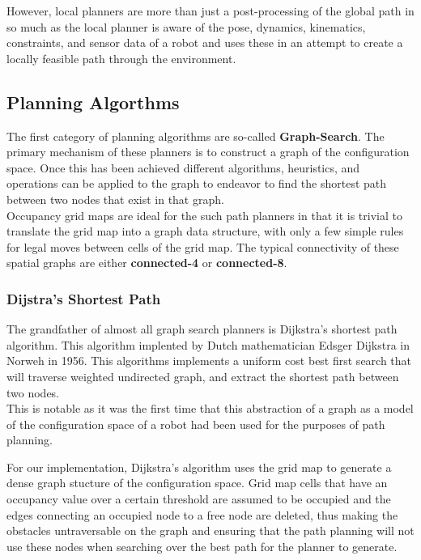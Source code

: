 \documentclass[journal]{IEEEtran}
\begin{document}
However, local planners are more than just a post-processing of the global path in so much as the local planner is aware of the pose, dynamics, kinematics, constraints, and sensor data of a robot and uses these in an attempt to create a locally feasible path through the environment. 


\subsection{Planning Algorthms}

The first category of planning algorithms are so-called \textbf{Graph-Search}. The primary mechanism of these planners is to construct a graph of the configuration space. Once this has been achieved different algorithms, heuristics, and operations can be applied to the graph to endeavor to find the shortest path between two nodes that exist in that graph. \\

Occupancy grid maps are ideal for the such path planners in that it is trivial to translate the grid map into a graph data structure, with only a few simple rules for legal moves between cells of the grid map. The typical connectivity of these spatial graphs are either \textbf{connected-4} or \textbf{connected-8}.


\subsubsection{Dijstra's Shortest Path}
The grandfather of almost all graph search planners is Dijkstra's shortest path algorithm. This algorithm implented by Dutch mathematician Edsger Dijkstra in Norweh in 1956. This algorithms implements a uniform cost best first search that will traverse weighted undirected graph, and extract the shortest path between two nodes. \\

This is notable as it was the first time that this abstraction of a graph as a model of the configuration space of a robot had been used for the purposes of path planning. 

For our implementation, Dijkstra's algorithm uses the grid map to generate a dense graph stucture of the configuration space. Grid map cells that have an occupancy value over a certain threshold are assumed to be occupied and the edges connecting an occupied node to a free node are deleted, thus making the obstacles untraversable on the graph and ensuring that the path planning will not use these nodes when searching over the best path for the planner to generate. \\
\end{document}
